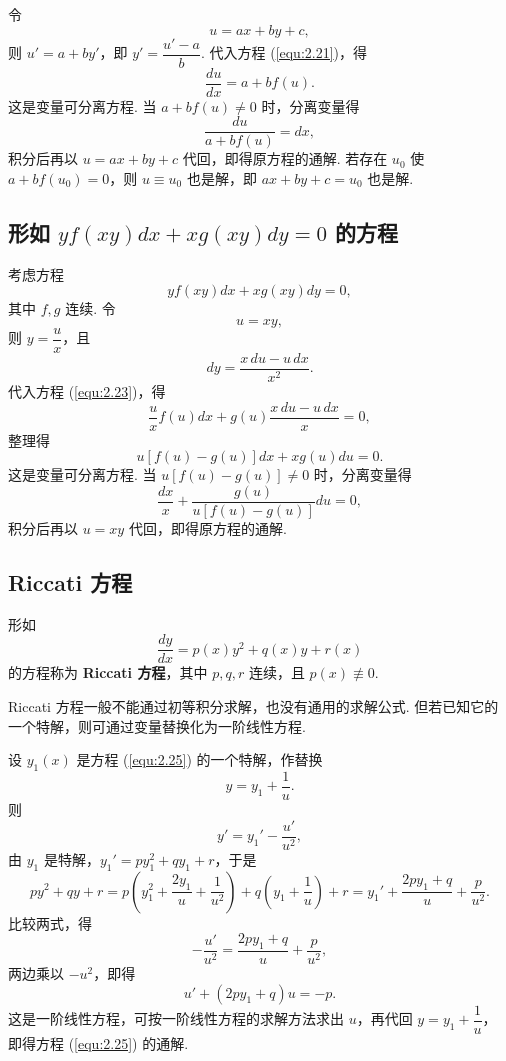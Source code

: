令
\[
u=ax+by+c,
\]
则 $u'=a+by'$，即 $y'=\dfrac{u'-a}{b}$. 代入方程 (\ref{equ:2.21})，得
\begin{equation}\label{equ:2.22}
\frac{du}{dx}=a+bf(u).
\end{equation}
这是变量可分离方程. 当 $a+bf(u)\neq0$ 时，分离变量得
\[
\frac{du}{a+bf(u)}=dx,
\]
积分后再以 $u=ax+by+c$ 代回，即得原方程的通解. 若存在 $u_0$ 使
$a+bf(u_0)=0$，则 $u\equiv u_0$ 也是解，即 $ax+by+c=u_0$ 也是解.

\subsection{形如 $yf(xy)dx+xg(xy)dy=0$ 的方程}
考虑方程
\begin{equation}\label{equ:2.23}
yf(xy)dx+xg(xy)dy=0,
\end{equation}
其中 $f,g$ 连续. 令
\[
u=xy,
\]
则 $y=\dfrac{u}{x}$，且
\[
dy=\frac{x\,du-u\,dx}{x^2}.
\]
代入方程 (\ref{equ:2.23})，得
\[
\frac{u}{x}f(u)dx+g(u)\frac{x\,du-u\,dx}{x}=0,
\]
整理得
\begin{equation}\label{equ:2.24}
u[f(u)-g(u)]dx+xg(u)du=0.
\end{equation}
这是变量可分离方程. 当 $u[f(u)-g(u)]\neq0$ 时，分离变量得
\[
\frac{dx}{x}+\frac{g(u)}{u[f(u)-g(u)]}du=0,
\]
积分后再以 $u=xy$ 代回，即得原方程的通解.

\subsection{Riccati 方程}
形如
\begin{equation}\label{equ:2.25}
\frac{dy}{dx}=p(x)y^2+q(x)y+r(x)
\end{equation}
的方程称为 \textbf{Riccati 方程}，其中 $p,q,r$ 连续，且 $p(x)\not\equiv0$.

Riccati 方程一般不能通过初等积分求解，也没有通用的求解公式.
但若已知它的一个特解，则可通过变量替换化为一阶线性方程.

设 $y_1(x)$ 是方程 (\ref{equ:2.25}) 的一个特解，作替换
\[
y=y_1+\frac{1}{u}.
\]
则
\[
y'=y_1'-\frac{u'}{u^2},
\]
由 $y_1$ 是特解，$y_1'=py_1^2+qy_1+r$，于是
\[
p y^2+q y+r
=p\left(y_1^2+\frac{2y_1}{u}+\frac{1}{u^2}\right)
+q\left(y_1+\frac{1}{u}\right)+r
=y_1'+\frac{2py_1+q}{u}+\frac{p}{u^2}.
\]
比较两式，得
\[
-\frac{u'}{u^2}=\frac{2py_1+q}{u}+\frac{p}{u^2},
\]
两边乘以 $-u^2$，即得
\begin{equation}\label{equ:2.26}
u'+(2py_1+q)u=-p.
\end{equation}
这是一阶线性方程，可按一阶线性方程的求解方法求出 $u$，再代回 $y=y_1+\dfrac{1}{u}$，
即得方程 (\ref{equ:2.25}) 的通解.

